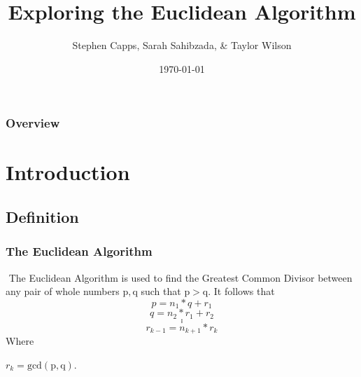 \documentclass[8pt]{beamer}
\title[Euclidean Algorithm]{Exploring the Euclidean Algorithm} %
\author{Stephen Capps, Sarah Sahibzada, \& Taylor Wilson} %
\institute[TAMU] %
{
Texas A\&{}M University \\ %
\medskip
\textit{Supurvisor: Sara Pollock} %
}
\date{\today} %
\begin{document}
\begin{frame}
\titlepage %
\end{frame}

\begin{frame}
\frametitle{Overview} %
\tableofcontents %
\end{frame}


\section{Introduction}
\subsection{Definition}
\begin{frame}
\frametitle{The Euclidean Algorithm} $ $
\indent The Euclidean Algorithm is used to find the Greatest Common Divisor between any pair of whole numbers $\mathrm{p, q}$ such that $\mathrm{p>q}$.
\indent It follows that 
$$p = n_1*q + r_1$$ 
$$q = n_2*r_1 + r_2$$
$$.$$
$$.$$
$$.$$
$$r_{k-1} = n_{k+1}*r_k$$
Where \begin{center}$r_k = \mathrm{gcd(p,q)}$.\end{center}
\end{frame}
\end{document}
